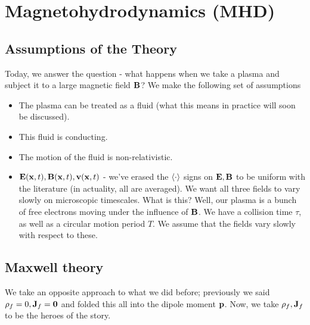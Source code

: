 \section{Magnetohydrodynamics (MHD)}

\subsection{Assumptions of the Theory}
Today, we answer the question - what happens when we take a plasma and subject it to a large magnetic field $\mathbf{B}$? We make the following set of assumptions

\begin{itemize}
    \item The plasma can be treated as a fluid (what this means in practice will soon be discussed).
    \item This fluid is conducting.
    \item The motion of the fluid is non-relativistic.
    \item $\mathbf{E}(\mathbf{x}, t), \mathbf{B}(\mathbf{x}, t), \mathbf{v}(\mathbf{x}, t)$ - we've erased the $\left< \cdot \right>$ signs on $\mathbf{E}, \mathbf{B}$ to be uniform with the literature (in actuality, all are averaged). We want all three fields to vary slowly on microscopic timescales. What is this? Well, our plasma is a bunch of free electrons moving under the influence of $\mathbf{B}$. We have a collision time $\tau$, as well as a circular motion period $T$. We assume that the fields vary slowly with respect to these.
\end{itemize}

\subsection{Maxwell theory}
We take an opposite approach to what we did before; previously we said $\rho_f = 0, \mathbf{J}_f = \mathbf{0}$ and folded this all into the dipole moment $\mathbf{p}$. Now, we take $\rho_f, \mathbf{J}_f$ to be the heroes of the story.

